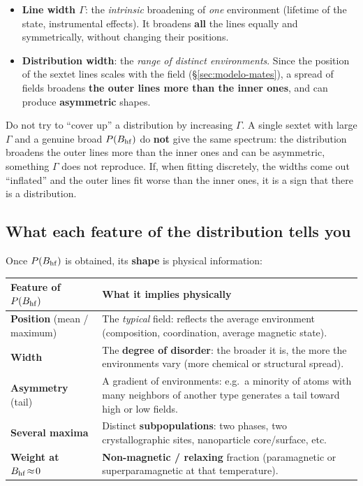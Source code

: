 \begin{itemize}[nosep]
  \item \textbf{Line width $\Gamma$}: the \emph{intrinsic} broadening of \emph{one}
        environment (lifetime of the state, instrumental effects). It broadens
        \textbf{all} the lines equally and symmetrically, without changing their
        positions.
  \item \textbf{Distribution width}: the \emph{range of distinct environments}.
        Since the position of the sextet lines scales with the field
        (\S\ref{sec:modelo-mates}), a spread of fields broadens \textbf{the outer
        lines more than the inner ones}, and can produce \textbf{asymmetric}
        shapes.
\end{itemize}

\begin{aviso}
Do not try to ``cover up'' a distribution by increasing $\Gamma$. A single sextet
with large $\Gamma$ and a genuine broad $P(B_{\mathrm{hf}})$ do \textbf{not} give the same
spectrum: the distribution broadens the outer lines more than the inner ones and
can be asymmetric, something $\Gamma$ does not reproduce. If, when fitting
discretely, the widths come out ``inflated'' and the outer lines fit worse than the
inner ones, it is a sign that there is a distribution.
\end{aviso}

\subsection{What each feature of the distribution tells you}

Once $P(B_{\mathrm{hf}})$ is obtained, its \textbf{shape} is physical information:

\begin{center}
\begin{tabular}{@{}lp{}@{}}
\toprule
\textbf{Feature of $P(B_{\mathrm{hf}})$} & \textbf{What it implies physically} \\
\midrule
\textbf{Position} (mean / maximum) & The \emph{typical} field: reflects the average
environment (composition, coordination, average magnetic state). \\[3pt]
\textbf{Width} & The \textbf{degree of disorder}: the broader it is, the more the
environments vary (more chemical or structural spread). \\[3pt]
\textbf{Asymmetry} (tail) & A gradient of environments: e.g.\ a minority of atoms
with many neighbors of another type generates a tail toward high or low fields. \\[3pt]
\textbf{Several maxima} & Distinct \textbf{subpopulations}: two phases, two
crystallographic sites, nanoparticle core/surface, etc. \\[3pt]
\textbf{Weight at $B_{\mathrm{hf}}\!\approx\!0$} & \textbf{Non-magnetic / relaxing} fraction
(paramagnetic or superparamagnetic at that temperature). \\
\bottomrule
\end{tabular}
\end{center}

